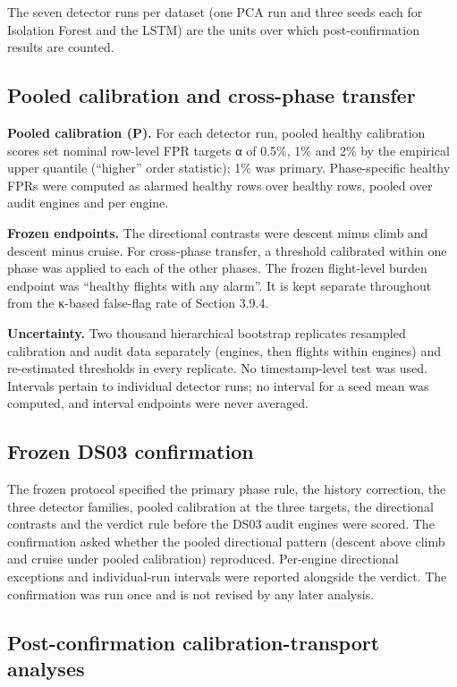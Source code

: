 \documentclass[preprint,11pt,a4paper]{elsarticle}
\begin{document}
The seven detector runs per dataset (one PCA run and three seeds each for Isolation Forest and the LSTM) are the units over which post-confirmation results are counted.

\subsection{Pooled calibration and cross-phase transfer}

\textbf{Pooled calibration (P).} For each detector run, pooled healthy calibration scores set nominal row-level FPR targets α of 0.5\%, 1\% and 2\% by the empirical upper quantile (``higher'' order statistic); 1\% was primary. Phase-specific healthy FPRs were computed as alarmed healthy rows over healthy rows, pooled over audit engines and per engine.

\textbf{Frozen endpoints.} The directional contrasts were descent minus climb and descent minus cruise. For cross-phase transfer, a threshold calibrated within one phase was applied to each of the other phases. The frozen flight-level burden endpoint was ``healthy flights with any alarm''. It is kept separate throughout from the κ-based false-flag rate of Section 3.9.4.

\textbf{Uncertainty.} Two thousand hierarchical bootstrap replicates resampled calibration and audit data separately (engines, then flights within engines) and re-estimated thresholds in every replicate. No timestamp-level test was used. Intervals pertain to individual detector runs; no interval for a seed mean was computed, and interval endpoints were never averaged.

\subsection{Frozen DS03 confirmation}

The frozen protocol specified the primary phase rule, the history correction, the three detector families, pooled calibration at the three targets, the directional contrasts and the verdict rule before the DS03 audit engines were scored. The confirmation asked whether the pooled directional pattern (descent above climb and cruise under pooled calibration) reproduced. Per-engine directional exceptions and individual-run intervals were reported alongside the verdict. The confirmation was run once and is not revised by any later analysis.

\subsection{Post-confirmation calibration-transport analyses}
\end{document}
